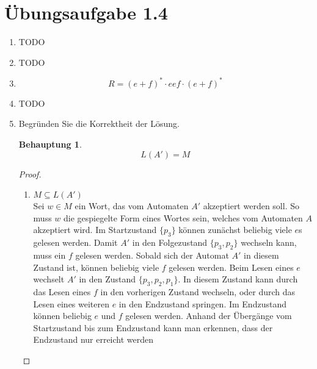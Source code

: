 \documentclass[a4paper]{scrartcl}
\newtheorem*{behaupt}{Behauptung}
\begin{document}
\section*{Übungsaufgabe 1.4}
\begin{enumerate}
    \item TODO
    \item TODO
    \item
        \begin{equation}
            R = (e + f)^* \cdot eef \cdot (e + f)^*
        \end{equation}
        
    \item TODO
    \item Begründen Sie die Korrektheit der Lösung. \\
        \begin{behaupt}
            \begin{equation*}
                L(A') = M
            \end{equation*}
        \end{behaupt}
        \begin{proof} \hfill \\
            \begin{enumerate}
                \item $M \subseteq L(A')$ \\
                    Sei $w \in M$ ein Wort, das vom Automaten $A'$ akzeptiert
                    werden soll.
                    So muss $w$ die gespiegelte Form eines Wortes sein, welches
                    vom Automaten $A$ akzeptiert wird.
                    Im Startzustand $\{p_3\}$ können zunächst beliebig viele
                    $e$s gelesen werden.
                    Damit $A'$ in den Folgezustand $\{p_3,p_2\}$ wechseln kann,
                    muss ein $f$ gelesen werden.
                    Sobald sich der Automat $A'$ in diesem Zustand ist, können
                    beliebig viele $f$ gelesen werden.
                    Beim Lesen eines $e$ wechselt $A'$ in den Zustand
                    $\{p_3,p_2,p_1\}$.
                    In diesem Zustand kann durch das Lesen eines $f$ in den
                    vorherigen Zustand wechseln, oder durch das Lesen eines
                    weiteren $e$ in den Endzustand springen.
                    Im Endzustand können beliebig $e$ und $f$ gelesen werden.
                    Anhand der Übergänge vom Startzustand bis zum Endzustand
                    kann man erkennen, dass der Endzustand nur erreicht werden

\end{enumerate}
\end{proof}
\end{enumerate}
\end{document}
